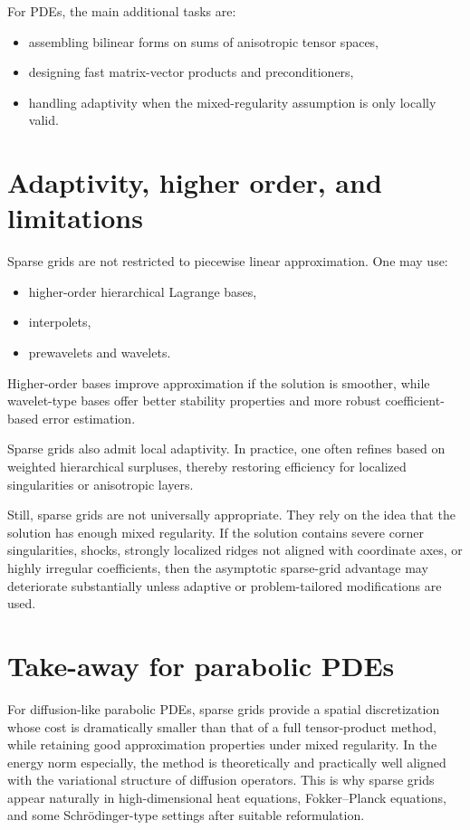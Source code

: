 \documentclass[11pt,a4paper]{report}
\begin{document}
For PDEs, the main additional tasks are:
\begin{itemize}
\item assembling bilinear forms on sums of anisotropic tensor spaces,
\item designing fast matrix-vector products and preconditioners,
\item handling adaptivity when the mixed-regularity assumption is only locally valid.
\end{itemize}

\section{Adaptivity, higher order, and limitations}

Sparse grids are not restricted to piecewise linear approximation. One may use:
\begin{itemize}
\item higher-order hierarchical Lagrange bases,
\item interpolets,
\item prewavelets and wavelets.
\end{itemize}
Higher-order bases improve approximation if the solution is smoother, while wavelet-type bases offer better stability properties and more robust coefficient-based error estimation.

Sparse grids also admit local adaptivity. In practice, one often refines based on weighted hierarchical surpluses, thereby restoring efficiency for localized singularities or anisotropic layers.

Still, sparse grids are not universally appropriate. They rely on the idea that the solution has enough mixed regularity. If the solution contains severe corner singularities, shocks, strongly localized ridges not aligned with coordinate axes, or highly irregular coefficients, then the asymptotic sparse-grid advantage may deteriorate substantially unless adaptive or problem-tailored modifications are used.

\section{Take-away for parabolic PDEs}

For diffusion-like parabolic PDEs, sparse grids provide a spatial discretization whose cost is dramatically smaller than that of a full tensor-product method, while retaining good approximation properties under mixed regularity. In the energy norm especially, the method is theoretically and practically well aligned with the variational structure of diffusion operators. This is why sparse grids appear naturally in high-dimensional heat equations, Fokker--Planck equations, and some Schr\"odinger-type settings after suitable reformulation.
\end{document}
